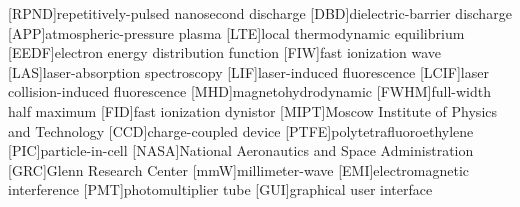 [RPND]{repetitively-pulsed nanosecond discharge}
[DBD]{dielectric-barrier discharge}
[APP]{atmospheric-pressure plasma}
[LTE]{local thermodynamic equilibrium}
[EEDF]{electron energy distribution function}
[FIW]{fast ionization wave}
[LAS]{laser-absorption spectroscopy}
[LIF]{laser-induced fluorescence}
[LCIF]{laser collision-induced fluorescence}
[MHD]{magnetohydrodynamic}
[FWHM]{full-width half maximum}
[FID]{fast ionization dynistor}
[MIPT]{Moscow Institute of Physics and Technology}
[CCD]{charge-coupled device}
[PTFE]{polytetrafluoroethylene}
[PIC]{particle-in-cell}
[NASA]{National Aeronautics and Space Administration}
[GRC]{Glenn Research Center}
[mmW]{millimeter-wave}
[EMI]{electromagnetic interference}
[PMT]{photomultiplier tube}
[GUI]{graphical user interface}
